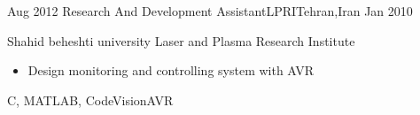 \begin{experiences}
  \emptySeparator

  \experience
  {Aug 2012} {Research And Development Assistant}{LPRI}{Tehran,Iran}
  {Jan 2010} {
    Shahid beheshti university Laser and Plasma Research Institute
    \begin{itemize}
      \item Design  monitoring and controlling system with AVR
    \end{itemize}
  }
  {C, MATLAB, CodeVisionAVR}
  {}

  \emptySeparator

\end{experiences}
